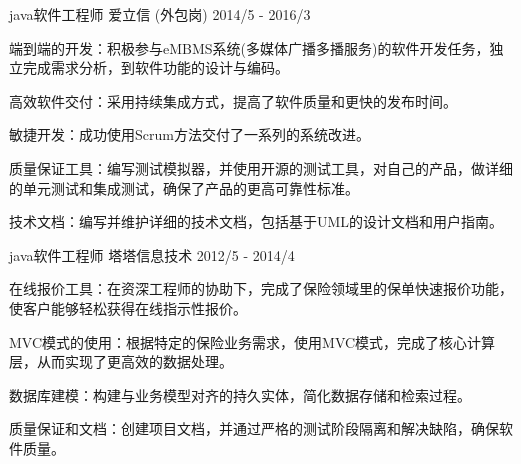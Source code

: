 \begin{cventries}
\cventry
  {java软件工程师 } %
  {爱立信 \tiny{(外包岗)}} %
  {} %
  {2014/5 - 2016/3} %
  {
    \begin{cvitems} %
      \item {端到端的开发：积极参与eMBMS系统(多媒体广播多播服务)的软件开发任务，独立完成需求分析，到软件功能的设计与编码。 }
      \item {高效软件交付：采用持续集成方式，提高了软件质量和更快的发布时间。}
      \item {敏捷开发：成功使用Scrum方法交付了一系列的系统改进。  }
      \item {质量保证工具：编写测试模拟器，并使用开源的测试工具，对自己的产品，做详细的单元测试和集成测试，确保了产品的更高可靠性标准。}
      \item { 技术文档：编写并维护详细的技术文档，包括基于UML的设计文档和用户指南。  }
    \end{cvitems}
  }

 

\cventry
  {java软件工程师} %
  {塔塔信息技术} %
  {} %
  {2012/5 - 2014/4} %
  {
    \begin{cvitems} %
      \item {在线报价工具：在资深工程师的协助下，完成了保险领域里的保单快速报价功能，使客户能够轻松获得在线指示性报价。}
      \item {MVC模式的使用：根据特定的保险业务需求，使用MVC模式，完成了核心计算层，从而实现了更高效的数据处理。}
      \item {数据库建模：构建与业务模型对齐的持久实体，简化数据存储和检索过程。}
      \item {质量保证和文档：创建项目文档，并通过严格的测试阶段隔离和解决缺陷，确保软件质量。  }
    \end{cvitems}
  }
  

\end{cventries}
